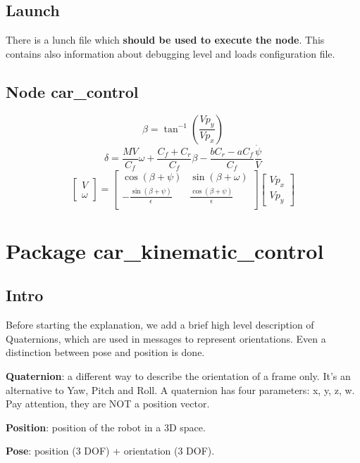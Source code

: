 \documentclass[12pt, letterpaper]{report}
\begin{document}
\subsection{Launch}

There is a lunch file which \textbf{should be used to execute the node}. This contains also information about debugging level and loads configuration file.

\subsection{Node car\_control}

\[
\beta = \tan^{-1}\left(\frac{Vp_y}{Vp_x}\right)
\]
\[
\delta = \frac{MV}{C_f}\omega + \frac{C_f + C_r}{C_f}\beta - \frac{bC_r - aC_f}{C_f}\frac{\dot{\psi}}{V}
\]
\[
\begin{bmatrix}
	V \\
	\omega
\end{bmatrix}
=
\begin{bmatrix}
	\cos(\beta + \psi) & \sin(\beta + \omega) \\
	-\frac{\sin(\beta + \psi)}{\epsilon} & \frac{\cos(\beta + \psi)}{\epsilon} \\
\end{bmatrix}
\begin{bmatrix}
	Vp_x \\
	Vp_y
\end{bmatrix}
\]

\section{Package car\_kinematic\_control}

\subsection{Intro}

Before starting the explanation, we add a brief high level description of Quaternions, which are used in messages to represent orientations. Even a distinction between pose and position is done.

\textbf{Quaternion}: a different way to describe the orientation of a frame only. It's an alternative to Yaw, Pitch and Roll. A quaternion has four parameters: x, y, z, w. Pay attention, they are NOT a position vector.

\textbf{Position}: position of the robot in a 3D space.

\textbf{Pose}: position (3 DOF) + orientation (3 DOF).
\end{document}

